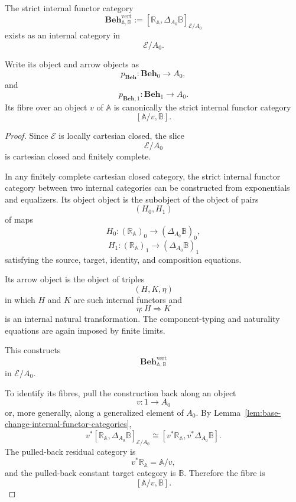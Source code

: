 \begin{theorem}
\label{thm:object-of-residual-behaviours}
    The strict internal functor category
    \[
        \mathbf{Beh}^{\mathrm{vert}}_{\mathbb A,\mathbb B}
        :=
        [\mathbb R_{\mathbb A},
          \Delta_{A_0}\mathbb B]_{\mathcal E/A_0}
    \]
    exists as an internal category in
    \[
        \mathcal E/A_0.
    \]

    Write its object and arrow objects as
    \[
        p_{\mathbf{Beh}}:
        \mathbf{Beh}_0\to A_0,
    \]
    and
    \[
        p_{\mathbf{Beh},1}:
        \mathbf{Beh}_1\to A_0.
    \]
    Its fibre over an object \(v\) of \(\mathbb A\) is canonically the strict
    internal functor category
    \[
        [\mathbb A/v,\mathbb B].
    \]
\end{theorem}
\begin{proof}
    Since \(\mathcal E\) is locally cartesian closed, the slice
    \[
        \mathcal E/A_0
    \]
    is cartesian closed and finitely complete.

    In any finitely complete cartesian closed category, the strict internal
    functor category between two internal categories can be constructed from
    exponentials and equalizers. Its object object is the subobject of the
    object of pairs
    \[
        (H_0,H_1)
    \]
    of maps
    \[
        H_0:
        (\mathbb R_{\mathbb A})_0
        \to
        (\Delta_{A_0}\mathbb B)_0,
    \]
    \[
        H_1:
        (\mathbb R_{\mathbb A})_1
        \to
        (\Delta_{A_0}\mathbb B)_1
    \]
    satisfying the source, target, identity, and composition equations.

    Its arrow object is the object of triples
    \[
        (H,K,\eta)
    \]
    in which \(H\) and \(K\) are such internal functors and
    \[
        \eta:H\Rightarrow K
    \]
    is an internal natural transformation. The component-typing and
    naturality equations are again imposed by finite limits.

    This constructs
    \[
        \mathbf{Beh}^{\mathrm{vert}}_{\mathbb A,\mathbb B}
    \]
    in \(\mathcal E/A_0\).

    To identify its fibres, pull the construction back along an object
    \[
        v:1\to A_0
    \]
    or, more generally, along a generalized element of \(A_0\). By
    Lemma~\ref{lem:base-change-internal-functor-categories},
    \[
        v^*
        [\mathbb R_{\mathbb A},
          \Delta_{A_0}\mathbb B]_{\mathcal E/A_0}
        \cong
        [v^*\mathbb R_{\mathbb A},
          v^*\Delta_{A_0}\mathbb B].
    \]
    The pulled-back residual category is
    \[
        v^*\mathbb R_{\mathbb A}
        =
        \mathbb A/v,
    \]
    and the pulled-back constant target category is \(\mathbb B\).
    Therefore the fibre is
    \[
        [\mathbb A/v,\mathbb B].
    \]
\end{proof}

